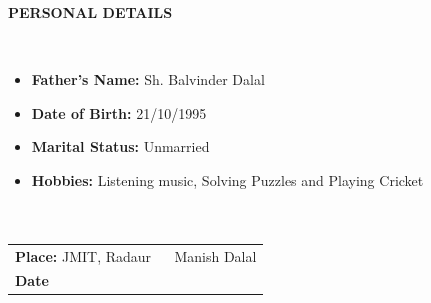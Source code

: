 \documentclass[a4paper,10pt]{article}
\newcommand{\lsep}{-0.5cm}
\newcommand{\resheading}[1]{{\small \colorbox{mygrey}{\begin{minipage}{0.975\textwidth}{\textbf{#1 \vphantom{p\^{E}}}}\end{minipage}}}}
\begin{document}
\resheading{\textbf{PERSONAL DETAILS} }\\[\lsep]
\begin{itemize}
\item \noindent \textbf{Father’s Name:} Sh. Balvinder Dalal
\item \noindent \textbf{Date of Birth: } 21/10/1995 
\item \noindent \textbf{Marital Status:} Unmarried
\item \noindent \textbf{Hobbies:} Listening music, Solving Puzzles and Playing Cricket \\ \\ \\ 
\end{itemize}
\begin{tabular}{ l @{\hskip 4.5in} l @{\hskip 1in}  }
\indent \textbf{Place: }JMIT, Radaur \,\, & Manish Dalal\\
\indent \textbf{Date}
\end{tabular}
\end{document}

